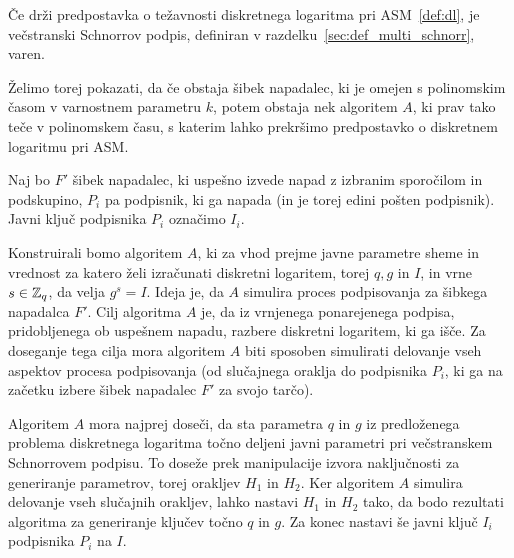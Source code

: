 \begin{izrek}
    Če drži predpostavka o težavnosti diskretnega logaritma pri ASM~\ref{def:dl}, je večstranski 
    Schnorrov podpis, definiran v razdelku~\ref{sec:def_multi_schnorr}, varen.
\end{izrek}

\begin{dokaz}
Želimo torej pokazati, da če obstaja šibek napadalec, ki je omejen s polinomskim časom v varnostnem
parametru $k$, potem obstaja nek algoritem $A$, ki prav tako teče v polinomskem času, s katerim lahko
prekršimo predpostavko o diskretnem logaritmu pri ASM.

Naj bo $F'$ šibek napadalec, ki uspešno izvede napad z izbranim sporočilom in podskupino, $P_i$ pa
podpisnik, ki ga napada (in je torej edini pošten podpisnik). Javni ključ podpisnika $P_i$ označimo
$I_i$.

Konstruirali bomo algoritem $A$, ki za vhod prejme javne parametre sheme in vrednost za katero želi
izračunati diskretni logaritem, torej $q, g$ in $I$, in vrne $s \in \mathbb Z_q$, da velja $g^s = I$. Ideja
je, da $A$ simulira proces podpisovanja za šibkega napadalca $F'$. Cilj algoritma $A$ je, da iz
vrnjenega ponarejenega podpisa, pridobljenega ob uspešnem napadu, razbere diskretni logaritem, ki ga
išče. Za doseganje tega cilja mora algoritem $A$ biti sposoben simulirati delovanje vseh aspektov
procesa podpisovanja (od slučajnega oraklja do podpisnika $P_i$, ki ga na začetku izbere šibek
napadalec $F'$ za svojo tarčo).

Algoritem $A$ mora najprej doseči, da sta parametra $q$ in $g$ iz predloženega problema diskretnega
logaritma točno deljeni javni parametri pri večstranskem Schnorrovem podpisu. To doseže prek
manipulacije izvora naključnosti za generiranje parametrov, torej orakljev $H_1$ in $H_2$. Ker
algoritem $A$ simulira delovanje vseh slučajnih orakljev, lahko nastavi $H_1$ in $H_2$ tako, da
bodo rezultati algoritma za generiranje ključev točno $q$ in $g$. Za konec nastavi še javni ključ
$I_i$ podpisnika $P_i$ na $I$.


\end{dokaz}
